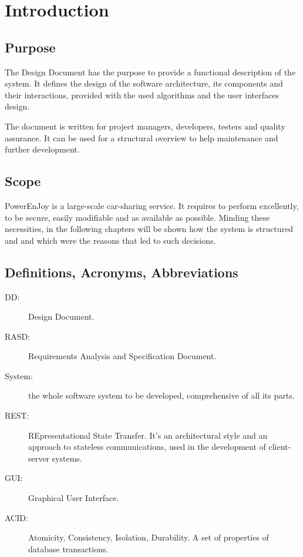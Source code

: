 \section{Introduction} \label{sec introduction}


\subsection{Purpose}

The Design Document has the purpose to provide a functional description of the system. It defines the design of the software architecture, its components and their interactions, provided with the used algorithms and the user interfaces design. 

The document is written for project managers, developers, testers and quality assurance. It can be used for a structural overview to help maintenance and further development.


\subsection{Scope}

PowerEnJoy is a large-scale car-sharing service. It requires to perform excellently, to be secure, easily modifiable and as available as possible. Minding these necessities, in the following chapters will be shown how the system is structured and and which were the reasons that led to such decisions.
  
\subsection{Definitions, Acronyms, Abbreviations}

\begin{description}
	\item[DD:] Design Document.
	\item[RASD:] Requirements Analysis and Specification Document.
	\item[System:] the whole software system to be developed, comprehensive of all its parts.
	\item[REST:] REpresentational State Transfer. It's an architectural style and an approach to stateless communications, used in the development of client-server systems.
	\item[GUI:] Graphical User Interface.
	\item[ACID:] Atomicity, Consistency, Isolation, Durability. A set of properties of database transactions.
\end{description}

